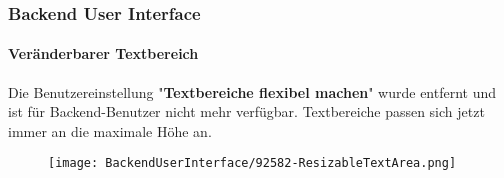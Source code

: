 %

\begin{frame}[fragile]
	\frametitle{Backend User Interface}
	\framesubtitle{Veränderbarer Textbereich}

	Die Benutzereinstellung "\textbf{Textbereiche flexibel machen}" wurde entfernt und ist für Backend-Benutzer nicht mehr verfügbar.
	Textbereiche passen sich jetzt immer an die maximale Höhe an.

	\begin{figure}
		\texttt{[image: BackendUserInterface/92582-ResizableTextArea.png]}
	\end{figure}

\end{frame}

